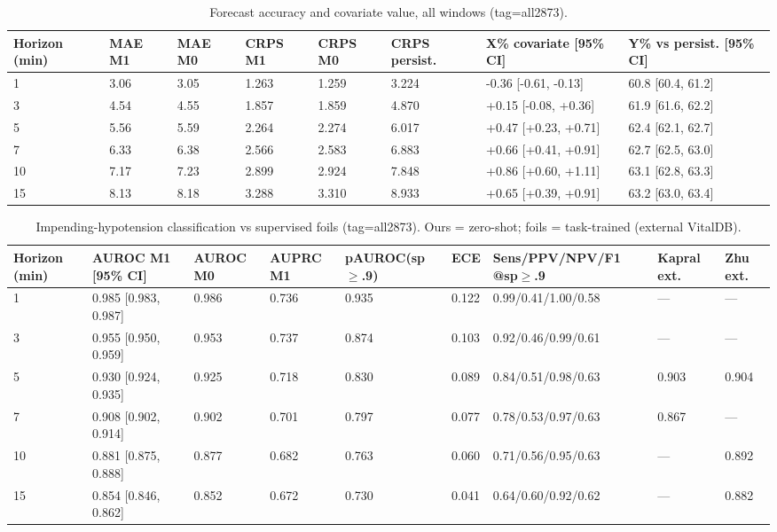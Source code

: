 \documentclass[10pt]{article}
\begin{document}
\begin{table}[H]\centering\footnotesize
\caption{Forecast accuracy and covariate value, all windows (tag=all2873).}
\begin{adjustbox}{max width=\textwidth}
\begin{tabular}{llllllll}
\toprule
\textbf{Horizon (min)} & \textbf{MAE M1} & \textbf{MAE M0} & \textbf{CRPS M1} & \textbf{CRPS M0} & \textbf{CRPS persist.} & \textbf{X\% covariate [95\% CI]} & \textbf{Y\% vs persist. [95\% CI]} \\
\midrule
1 & 3.06 & 3.05 & 1.263 & 1.259 & 3.224 & -0.36 [-0.61, -0.13] & 60.8 [60.4, 61.2] \\
3 & 4.54 & 4.55 & 1.857 & 1.859 & 4.870 & +0.15 [-0.08, +0.36] & 61.9 [61.6, 62.2] \\
5 & 5.56 & 5.59 & 2.264 & 2.274 & 6.017 & +0.47 [+0.23, +0.71] & 62.4 [62.1, 62.7] \\
7 & 6.33 & 6.38 & 2.566 & 2.583 & 6.883 & +0.66 [+0.41, +0.91] & 62.7 [62.5, 63.0] \\
10 & 7.17 & 7.23 & 2.899 & 2.924 & 7.848 & +0.86 [+0.60, +1.11] & 63.1 [62.8, 63.3] \\
15 & 8.13 & 8.18 & 3.288 & 3.310 & 8.933 & +0.65 [+0.39, +0.91] & 63.2 [63.0, 63.4] \\
\bottomrule
\end{tabular}
\end{adjustbox}
\end{table}

\begin{table}[H]\centering\footnotesize
\caption{Impending-hypotension classification vs supervised foils (tag=all2873). Ours = zero-shot; foils = task-trained (external VitalDB).}
\begin{adjustbox}{max width=\textwidth}
\begin{tabular}{lllllllll}
\toprule
\textbf{Horizon (min)} & \textbf{AUROC M1 [95\% CI]} & \textbf{AUROC M0} & \textbf{AUPRC M1} & \textbf{pAUROC(sp$\geq$.9)} & \textbf{ECE} & \textbf{Sens/PPV/NPV/F1 @sp$\geq$.9} & \textbf{Kapral ext.} & \textbf{Zhu ext.} \\
\midrule
1 & 0.985 [0.983, 0.987] & 0.986 & 0.736 & 0.935 & 0.122 & 0.99/0.41/1.00/0.58 & --- & --- \\
3 & 0.955 [0.950, 0.959] & 0.953 & 0.737 & 0.874 & 0.103 & 0.92/0.46/0.99/0.61 & --- & --- \\
5 & 0.930 [0.924, 0.935] & 0.925 & 0.718 & 0.830 & 0.089 & 0.84/0.51/0.98/0.63 & 0.903 & 0.904 \\
7 & 0.908 [0.902, 0.914] & 0.902 & 0.701 & 0.797 & 0.077 & 0.78/0.53/0.97/0.63 & 0.867 & --- \\
10 & 0.881 [0.875, 0.888] & 0.877 & 0.682 & 0.763 & 0.060 & 0.71/0.56/0.95/0.63 & --- & 0.892 \\
15 & 0.854 [0.846, 0.862] & 0.852 & 0.672 & 0.730 & 0.041 & 0.64/0.60/0.92/0.62 & --- & 0.882 \\
\bottomrule
\end{tabular}
\end{adjustbox}
\end{table}
\end{document}
